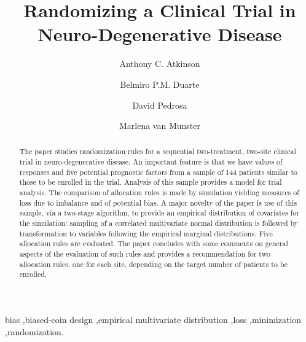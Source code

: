 \documentclass[number,12pt,review]{elsarticle}
\begin{document}
\begin{frontmatter}
  \title{Randomizing a Clinical Trial in Neuro-Degenerative Disease}
  \author[lse]{Anthony C. Atkinson{}}
	\author[isec,deq]{Belmiro P.M. Duarte}
	\author[marburg1,marburg2]{David Pedrosa}
	\author[marburg1]{Marlena van Munster}
	\address[lse]{Department of Statistics, London School of Economics, London WC2A 2AE, United Kingdom.}
  \address[isec]{Polytechnic Institute of Coimbra, ISEC, Department of Chemical \& Biological Engineering,
	Rua Pedro Nunes, 3030--199 Coimbra, Portugal.}
	\address[deq]{Univ Coimbra, {CIEPQPF}, Department of Chemical Engineering, Rua S\'{\i}lvio Lima --- P\'olo~II, 3030--790 Coimbra, Portugal.}
	\address[marburg1]{Department of Neurology, University Hospital Marburg, 35043 Marburg, Germany}
	\address[marburg2]{Center for Mind, Brain and Behavior, Philipps-University Marburg, 35032 Marburg, Germany}

%
\begin{abstract}\label{sec:abstract}
The paper studies randomization rules for a sequential two-treatment, two-site clinical trial in neuro-degenerative disease. An important feature is that we have values of responses and five potential prognostic factors from a sample of 144 patients similar to those to be enrolled in the trial.  Analysis of this sample provides a model for trial analysis. The comparison of allocation rules is made by simulation yielding measures of loss due to imbalance and of potential bias. A major novelty of the paper is  use of this sample, via a  two-stage algorithm, to provide an empirical distribution of covariates for the simulation: sampling of a correlated multivariate normal distribution is followed by transformation to variables following the empirical marginal distributions. Five allocation rules are evaluated. The paper concludes with some comments on general aspects of the evaluation of such rules and provides a recommendation for two allocation rules, one for each site, depending on the target number of patients to be enrolled.
\end{abstract}

\begin{keyword}
  bias \sep biased-coin design \sep empirical multivariate distribution \sep loss \sep minimization \sep randomization.
\end{keyword}
\end{frontmatter}
\end{document}
